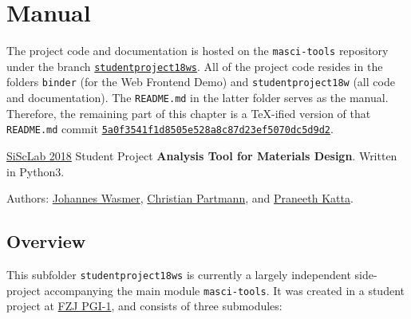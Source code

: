 
\chapter{Manual}
\label{cha:manual}

The project code and documentation is hosted on the \texttt{masci-tools}
repository \cite{masci-tools} under the branch
\href{https://github.com/JuDFTteam/masci-tools/tree/studentproject18ws}{\texttt{studentproject18ws}}.
All of the project code resides in the folders \texttt{binder} (for the Web
Frontend Demo) and \texttt{studentproject18w} (all code and documentation). The
\texttt{README.md} in the latter folder serves as the manual. Therefore, the
remaining part of this chapter is a \TeX{}-ified version of that
\texttt{README.md} commit
\href{https://github.com/JuDFTteam/masci-tools/tree/5a0f3541f1d8505e528a8c87d23ef5070dc5d9d2}{\texttt{5a0f3541f1d8505e528a8c87d23ef5070dc5d9d2}}.

\vspace{3em}
\hdashrule{\textwidth}{2pt}{2pt}

\href{https://www.aices.rwth-aachen.de/en/academics/masters-program-simulation-sciences}{SiScLab
2018} Student Project \textbf{Analysis Tool for Materials
  Design}. Written in Python3.

Authors: \href{https://github.com/Irratzo}{Johannes Wasmer},
\href{https://github.com/ChristianPartmann}{Christian Partmann}, and
\href{https://github.com/PraneethKatta}{Praneeth Katta}.

\section{Overview}\label{overview}

This subfolder \texttt{studentproject18ws} is currently a largely
independent side-project accompanying the main module
\texttt{masci-tools}. It was created in a student project at \href{http://www.fz-juelich.de/pgi/pgi-1/EN/Home/home_node.html}{FZJ PGI-1}, and consists
of three submodules:

